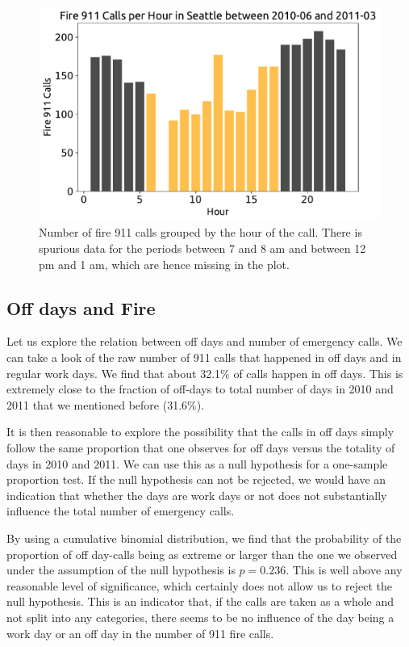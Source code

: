 \documentclass[12pt,a4paper]{article}
\begin{document}
\begin{figure}[ht!]
\centering
\includegraphics[scale=0.65]{figs/TimeOfTheDay.pdf}
\caption{Number of fire 911 calls grouped by the hour of the call. There is spurious data for the periods between 7 and 8 am and between 12 pm and 1 am, which are hence missing in the plot.}
\label{TimeOfTheDay}
\end{figure}

\subsection{Off days and Fire}

Let us explore the relation between off days and number of emergency calls. We can take a look of the raw number of 911 calls that happened in off days and in regular work days. We find that about 32.1\% of calls happen in off days. This is extremely close to the fraction of off-days to total number of days in 2010 and 2011 that we mentioned before (31.6\%).

It is then reasonable to explore the possibility that the calls in off days simply follow the same proportion that one observes for off days versus the totality of days in 2010 and 2011. We can use this as a null hypothesis for a one-sample proportion test. If the null hypothesis can not be rejected, we would have an indication that whether the days are work days or not does not substantially influence the total number of emergency calls.

By using a cumulative binomial distribution, we find that the probability of the proportion of off day-calls being as extreme or larger than the one we observed under the assumption of the null hypothesis is $p = 0.236$. This is well above any reasonable level of significance, which certainly does not allow us to reject the null hypothesis. This is an indicator that, if the calls are taken as a whole and not split into any categories, there seems to be no influence of the day being a work day or an off day in the number of 911 fire calls.
\end{document}
